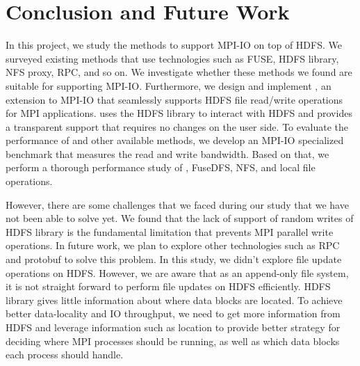 \section{Conclusion and Future Work}
In this project, we study the methods to support MPI-IO on top of HDFS. We
surveyed existing methods that use technologies such as FUSE, HDFS library, NFS
proxy, RPC, and so on. We investigate whether these methods we found are
suitable for supporting MPI-IO. Furthermore, we design and implement {\proj}, an
extension to MPI-IO that seamlessly supports HDFS file read/write operations for
MPI applications. {\proj} uses the HDFS library to interact with HDFS and provides
a transparent support that requires no changes on the user side. To evaluate the
performance of {\proj} and other available methods, we develop an MPI-IO
specialized benchmark that measures the read and write bandwidth. Based on that,
we perform a thorough performance study of {\proj}, FuseDFS, NFS, and local file
operations.

However, there are some challenges that we faced during our study that we have not
been able to solve yet. We
found that the lack of support of random writes of HDFS library is the
fundamental limitation that prevents MPI parallel write operations. In future
work, we plan to explore other technologies such as RPC and protobuf to solve
this problem. In this study, we didn't explore file update operations on HDFS.
However, we are aware that as an append-only file system, it is not straight
forward to perform file updates on HDFS efficiently. HDFS library gives little
information about where data blocks are located. To achieve better data-locality and
IO throughput, we need to get more information from HDFS and leverage
information such as location to provide better strategy for deciding where MPI
processes should be running, as well as which data blocks each process should handle.
